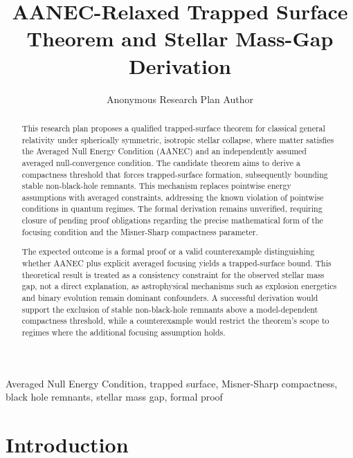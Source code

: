 \documentclass[conference]{IEEEtran}
\begin{document}
\title{AANEC-Relaxed Trapped Surface Theorem and Stellar Mass-Gap Derivation}\author{Anonymous Research Plan Author}\maketitle

\begin{abstract}
This research plan proposes a qualified trapped-surface theorem for classical general relativity under spherically symmetric, isotropic stellar collapse, where matter satisfies the Averaged Null Energy Condition (AANEC) and an independently assumed averaged null-convergence condition. The candidate theorem aims to derive a compactness threshold that forces trapped-surface formation, subsequently bounding stable non-black-hole remnants. This mechanism replaces pointwise energy assumptions with averaged constraints, addressing the known violation of pointwise conditions in quantum regimes. The formal derivation remains unverified, requiring closure of pending proof obligations regarding the precise mathematical form of the focusing condition and the Misner-Sharp compactness parameter.

The expected outcome is a formal proof or a valid counterexample distinguishing whether AANEC plus explicit averaged focusing yields a trapped-surface bound. This theoretical result is treated as a consistency constraint for the observed stellar mass gap, not a direct explanation, as astrophysical mechanisms such as explosion energetics and binary evolution remain dominant confounders. A successful derivation would support the exclusion of stable non-black-hole remnants above a model-dependent compactness threshold, while a counterexample would restrict the theorem's scope to regimes where the additional focusing assumption holds.
\end{abstract}
\begin{IEEEkeywords}
Averaged Null Energy Condition, trapped surface, Misner-Sharp compactness, black hole remnants, stellar mass gap, formal proof
\end{IEEEkeywords}\section{Introduction}
\end{document}
